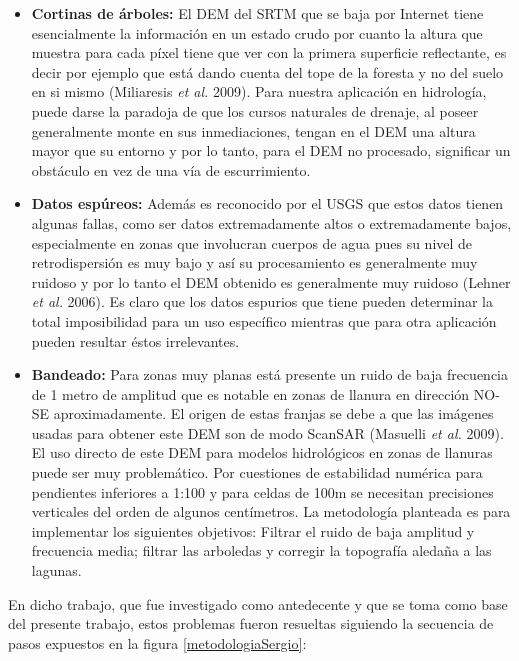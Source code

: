 \documentclass[10pt,a4paper, twoside]{report}
\begin{document}
\begin{itemize}
	\item \textbf{Cortinas de árboles:} El DEM del SRTM que se baja por Internet tiene esencialmente la información en un estado crudo por cuanto la altura que muestra para cada píxel tiene que ver con la primera superficie reflectante, es decir por ejemplo que está dando cuenta del tope de la foresta y no del suelo en si mismo (Miliaresis \textit{et al.} 2009). Para nuestra aplicación en hidrología, puede darse la paradoja de que los cursos naturales de drenaje, al poseer generalmente monte en sus inmediaciones, tengan en el DEM una altura mayor que su entorno y por lo tanto, para el DEM no procesado, significar un obstáculo en vez de una vía de escurrimiento.
	\item \textbf{Datos espúreos:} Además es reconocido por el USGS que estos datos tienen algunas fallas, como ser datos extremadamente altos o extremadamente bajos, especialmente en zonas que involucran cuerpos de agua pues su nivel de retrodispersión es muy bajo y así su procesamiento es generalmente muy ruidoso y por lo tanto el DEM obtenido es generalmente muy ruidoso (Lehner \textit{et al.} 2006). Es claro que los datos espurios que tiene pueden determinar la total imposibilidad para un uso específico mientras que para otra aplicación pueden resultar éstos irrelevantes.
	\item \textbf{Bandeado:} Para zonas muy planas está presente un ruido de baja frecuencia de 1 metro de amplitud que es notable en zonas de llanura en dirección NO-SE aproximadamente. El origen de estas franjas se debe a que las imágenes usadas para obtener este DEM son de modo ScanSAR (Masuelli \textit{et al.} 2009). El uso directo de este DEM para modelos hidrológicos en zonas de llanuras puede ser muy problemático. Por cuestiones de estabilidad numérica para pendientes inferiores a 1:100 y para celdas de 100m se necesitan precisiones verticales del orden de algunos centímetros. La metodología planteada es para implementar los siguientes objetivos: Filtrar el ruido de baja amplitud y frecuencia media; filtrar las arboledas y corregir la topografía aledaña a las lagunas.	
\end{itemize}


En dicho trabajo, que fue investigado como antedecente y que se toma como base del presente trabajo, estos problemas fueron resueltas siguiendo la secuencia de pasos expuestos en la figura \ref{metodologiaSergio}:
\end{document}
